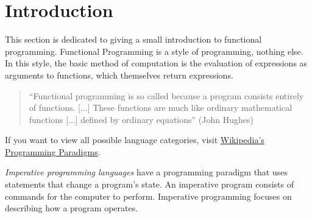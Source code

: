 \section{Introduction}\label{sec:Introduction}
This section is dedicated to giving a small introduction to functional programming.
Functional Programming is a style of programming, nothing else.
In this style, the basic method of computation is the evaluation of expressions as arguments to functions, which themselves return expressions.

\begin{quote}
  ``Functional programming is so called because a program consists entirely of functions. [$\ldots$]
  These functions are much like ordinary mathematical functions [$\ldots$] defined by ordinary equations'' (John Hughes)
\end{quote}

If you want to view all possible language categories, visit \href{https://en.wikipedia.org/wiki/Programming_paradigm}{Wikipedia's Programming Paradigms}.

\begin{definition}\label{def:Imperative_Programming_Language}
  \emph{Imperative programming languages} have a programming paradigm that uses statements that change a program's state.
  An imperative program consists of commands for the computer to perform.
  Imperative programming focuses on describing how a program operates.
\end{definition}

